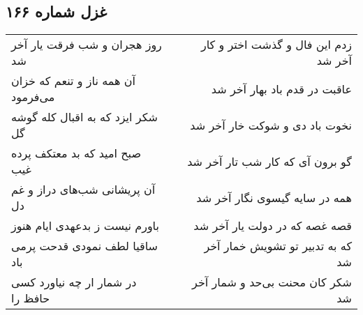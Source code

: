 \begin{center}
\section*{غزل شماره ۱۶۶}
\label{sec:sh166}
\begin{longtable}{l p{0.5cm} r}
روز هجران و شب فرقت یار آخر شد
&&
زدم این فال و گذشت اختر و کار آخر شد
\\
آن همه ناز و تنعم که خزان می‌فرمود
&&
عاقبت در قدم باد بهار آخر شد
\\
شکر ایزد که به اقبال کله گوشه گل
&&
نخوت باد دی و شوکت خار آخر شد
\\
صبح امید که بد معتکف پرده غیب
&&
گو برون آی که کار شب تار آخر شد
\\
آن پریشانی شب‌های دراز و غم دل
&&
همه در سایه گیسوی نگار آخر شد
\\
باورم نیست ز بدعهدی ایام هنوز
&&
قصه غصه که در دولت یار آخر شد
\\
ساقیا لطف نمودی قدحت پرمی باد
&&
که به تدبیر تو تشویش خمار آخر شد
\\
در شمار ار چه نیاورد کسی حافظ را
&&
شکر کان محنت بی‌حد و شمار آخر شد
\\
\end{longtable}
\end{center}
